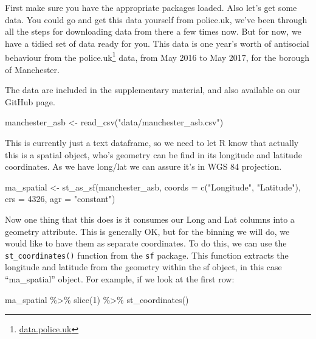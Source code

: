 \documentclass[
  krantz2]{krantz}
\makeatletter
\newenvironment{Shaded}{\begin{snugshade}}{\end{snugshade}}
\newcommand{\AttributeTok}[1]{\textcolor[rgb]{0.61,0.61,0.61}{#1}}
\newcommand{\DecValTok}[1]{\textcolor[rgb]{0.06,0.06,0.06}{#1}}
\newcommand{\FunctionTok}[1]{\textcolor[rgb]{0,0,0}{#1}}
\newcommand{\NormalTok}[1]{#1}
\newcommand{\OtherTok}[1]{\textcolor[rgb]{0.37,0.37,0.37}{#1}}
\newcommand{\SpecialCharTok}[1]{\textcolor[rgb]{0,0,0}{#1}}
\newcommand{\StringTok}[1]{\textcolor[rgb]{0.5,0.5,0.5}{#1}}
\renewcommand{\href}[2]{#2\footnote{\url{#1}}}
\newenvironment{kframe}{%
\medskip{}
\setlength{\fboxsep}{.8em}
 \def\at@end@of@kframe{}%
 \ifinner\ifhmode%
  \def\at@end@of@kframe{\end{minipage}}%
  \begin{minipage}{\columnwidth}%
 \fi\fi%
 \def\FrameCommand##1{\hskip\@totalleftmargin \hskip-\fboxsep
 \colorbox{shadecolor}{##1}\hskip-\fboxsep
     \hskip-\linewidth \hskip-\@totalleftmargin \hskip\columnwidth}%
 \MakeFramed {\advance\hsize-\width
   \@totalleftmargin\z@ \linewidth\hsize
   \@setminipage}}%
 {\par\unskip\endMakeFramed%
 \at@end@of@kframe}
\renewenvironment{Shaded}{\begin{kframe}}{\end{kframe}}
\makeatother
\begin{document}
First make sure you have the appropriate packages loaded. Also let's get some data. You could go and get this data yourself from police.uk, we've been through all the steps for downloading data from there a few times now. But for now, we have a tidied set of data ready for you. This data is one year's worth of antisocial behaviour from the \href{data.police.uk}{police.uk} data, from May 2016 to May 2017, for the borough of Manchester.

The data are included in the supplementary material, and also available on our GitHub page.

\begin{Shaded}
\begin{Highlighting}[]
\NormalTok{manchester\_asb }\OtherTok{\textless{}{-}} \FunctionTok{read\_csv}\NormalTok{(}\StringTok{"data/manchester\_asb.csv"}\NormalTok{)}
\end{Highlighting}
\end{Shaded}

This is currently just a text dataframe, so we need to let R know that actually this is a spatial object, who's geometry can be find in its longitude and latitude coordinates. As we have long/lat we can assure it's in WGS 84 projection.

\begin{Shaded}
\begin{Highlighting}[]
\NormalTok{ma\_spatial }\OtherTok{\textless{}{-}} \FunctionTok{st\_as\_sf}\NormalTok{(manchester\_asb, }
                       \AttributeTok{coords =} \FunctionTok{c}\NormalTok{(}\StringTok{"Longitude"}\NormalTok{, }\StringTok{"Latitude"}\NormalTok{),}
                       \AttributeTok{crs =} \DecValTok{4326}\NormalTok{, }
                       \AttributeTok{agr =} \StringTok{"constant"}\NormalTok{)}
\end{Highlighting}
\end{Shaded}

Now one thing that this does is it consumes our Long and Lat columns into a geometry attribute. This is generally OK, but for the binning we will do, we would like to have them as separate coordinates. To do this, we can use the \texttt{st\_coordinates()} function from the \texttt{sf} package. This function extracts the longitude and latitude from the geometry within the sf object, in this case ``ma\_spatial'' object. For example, if we look at the first row:

\begin{Shaded}
\begin{Highlighting}[]
\NormalTok{ma\_spatial }\SpecialCharTok{\%\textgreater{}\%} 
  \FunctionTok{slice}\NormalTok{(}\DecValTok{1}\NormalTok{) }\SpecialCharTok{\%\textgreater{}\%} 
  \FunctionTok{st\_coordinates}\NormalTok{()}
\end{Highlighting}
\end{Shaded}
\end{document}
